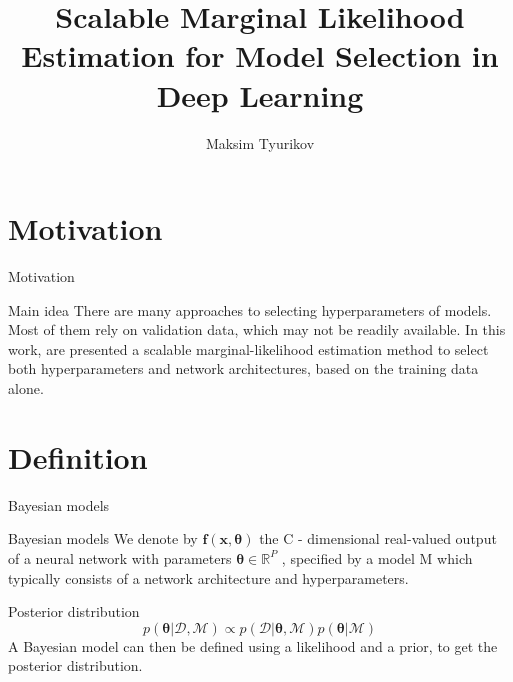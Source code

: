 \documentclass{beamer}
\title{Scalable Marginal Likelihood Estimation for Model Selection in Deep Learning}
\author{Maksim Tyurikov}
\institute{MIPT, 2023}
\begin{document}
\begin{frame}
    \titlepage
\end{frame}


\begin{frame}
    \tableofcontents
\end{frame}


\section{Motivation}
\begin{frame}{Motivation}
    \begin{block}{Main idea}
        There are many approaches to selecting hyperparameters of models.
        Most of them rely on validation data, which may not
        be readily available. In this work, are presented a
        scalable marginal-likelihood estimation method
        to select both hyperparameters and network architectures, based on the training data alone. 
    \end{block} 
\end{frame}

\section{Definition}
\begin{frame}{Bayesian models}
    \begin{block}{Bayesian models}
        We denote by $\boldsymbol{f}(\boldsymbol{x}, \boldsymbol{\theta})$ the C - dimensional real-valued output of a neural network with parameters $\boldsymbol{\theta} \in	\mathbb{R}^{P}$ , specified by a model M which typically consists of a network architecture and hyperparameters.
    \end{block}
    \begin{block}{Posterior distribution}
        \begin{equation}
            p(\boldsymbol{\theta}|\mathcal{D},\mathcal{M}) \propto p(\mathcal{D}|\boldsymbol{\theta},\mathcal{M}) p(\boldsymbol{\theta}|\mathcal{M})
        \end{equation} 
        A Bayesian model can then be defined using a likelihood and a prior, to get the posterior distribution.
    \end{block}
\end{frame}
\end{document}
